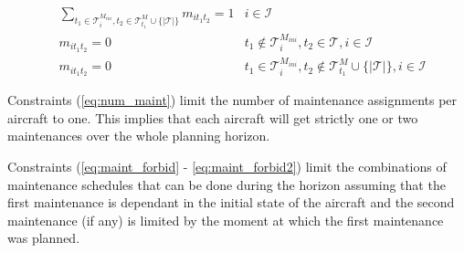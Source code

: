 \documentclass[a4paper,onecolumn,fleqn]{article}
\begin{document}
    \begin{align}
        & \sum_{t_1 \in \mathcal{T}^{M_{ini}}_i, t_2 \in \mathcal{T}^M_{t_1} \cup \{|\mathcal{T}|\} } m_{it_1t_2} =  1 
          & i \in \mathcal{I}\label{eq:num_maint} \\
        & m_{it_1t_2} =  0
          & t_1 \notin \mathcal{T}^{M_{ini}}_i, t_2 \in \mathcal{T}, i \in \mathcal{I} \label{eq:maint_forbid} \\
        & m_{it_1t_2} =  0
          & t_1 \in \mathcal{T}^{M_{ini}}_i, t_2 \notin \mathcal{T}^M_{t_1} \cup \{|\mathcal{T}|\}, i \in \mathcal{I} \label{eq:maint_forbid2}
    \end{align}

    Constraints (\ref{eq:num_maint}) limit the number of maintenance assignments per aircraft to one. This implies that each aircraft will get strictly one or two maintenances over the whole planning horizon.

    Constraints (\ref{eq:maint_forbid} - \ref{eq:maint_forbid2}) limit the combinations of maintenance schedules that can be done during the horizon assuming that the first maintenance is dependant in the initial state of the aircraft and the second maintenance (if any) is limited by the moment at which the first maintenance was planned.
\end{document}
